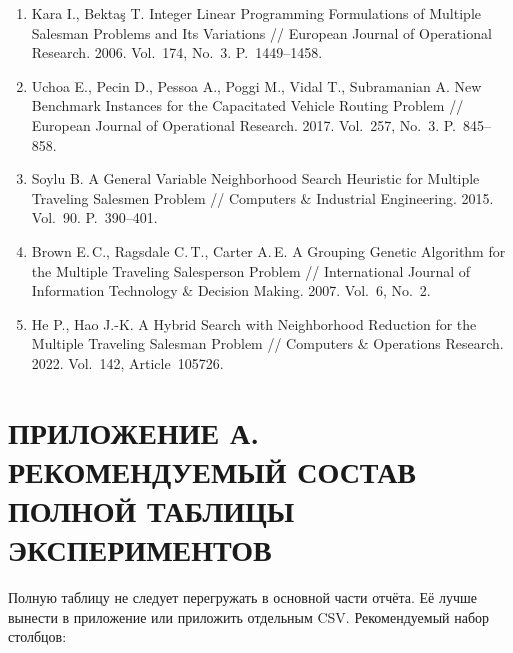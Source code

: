 \documentclass[14pt,a4paper]{extarticle}
\begin{document}
\begin{enumerate}
  \item Kara I., Bektaş T. Integer Linear Programming Formulations of Multiple Salesman Problems and Its Variations // European Journal of Operational Research. 2006. Vol.~174, No.~3. P.~1449--1458.
  \item Uchoa E., Pecin D., Pessoa A., Poggi M., Vidal T., Subramanian A. New Benchmark Instances for the Capacitated Vehicle Routing Problem // European Journal of Operational Research. 2017. Vol.~257, No.~3. P.~845--858.
  \item Soylu B. A General Variable Neighborhood Search Heuristic for Multiple Traveling Salesmen Problem // Computers \& Industrial Engineering. 2015. Vol.~90. P.~390--401.
  \item Brown E.\,C., Ragsdale C.\,T., Carter A.\,E. A Grouping Genetic Algorithm for the Multiple Traveling Salesperson Problem // International Journal of Information Technology \& Decision Making. 2007. Vol.~6, No.~2.
  \item He P., Hao J.-K. A Hybrid Search with Neighborhood Reduction for the Multiple Traveling Salesman Problem // Computers \& Operations Research. 2022. Vol.~142, Article~105726.
\end{enumerate}

\newpage
\section*{ПРИЛОЖЕНИЕ А. РЕКОМЕНДУЕМЫЙ СОСТАВ ПОЛНОЙ ТАБЛИЦЫ ЭКСПЕРИМЕНТОВ}

Полную таблицу не следует перегружать в основной части отчёта. Её лучше вынести в приложение или приложить отдельным CSV. Рекомендуемый набор столбцов:
\end{document}
